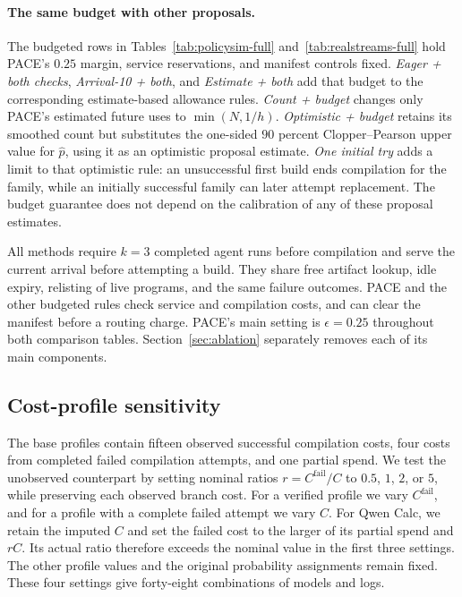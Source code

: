 \paragraph{The same budget with other proposals.}
The budgeted rows in Tables~\ref{tab:policysim-full} and~\ref{tab:realstreams-full} hold PACE's $0.25$ margin, service reservations, and manifest controls fixed.
\emph{Eager + both checks}, \emph{Arrival-10 + both}, and \emph{Estimate + both} add that budget to the corresponding estimate-based allowance rules.
\emph{Count + budget} changes only PACE's estimated future uses to $\min(N,1/h)$.
\emph{Optimistic + budget} retains its smoothed count but substitutes the one-sided $90$ percent Clopper--Pearson upper value for $\hat p$, using it as an optimistic proposal estimate.
\emph{One initial try} adds a limit to that optimistic rule: an unsuccessful first build ends compilation for the family, while an initially successful family can later attempt replacement.
The budget guarantee does not depend on the calibration of any of these proposal estimates.

All methods require $k=3$ completed agent runs before compilation and serve the current arrival before attempting a build.
They share free artifact lookup, idle expiry, relisting of live programs, and the same failure outcomes.
PACE and the other budgeted rules check service and compilation costs, and can clear the manifest before a routing charge.
PACE's main setting is $\epsilon=0.25$ throughout both comparison tables.
Section~\ref{sec:ablation} separately removes each of its main components.


\subsection{Cost-profile sensitivity}\label{app:cost-sensitivity}
\label{sec:price-sensitivity}

The base profiles contain fifteen observed successful compilation costs, four costs from completed failed compilation attempts, and one partial spend.
We test the unobserved counterpart by setting nominal ratios $r=C^{\mathrm{fail}}/C$ to $0.5$, $1$, $2$, or $5$, while preserving each observed branch cost.
For a verified profile we vary $C^{\mathrm{fail}}$, and for a profile with a complete failed attempt we vary $C$.
For Qwen Calc, we retain the imputed $C$ and set the failed cost to the larger of its partial spend and $rC$.
Its actual ratio therefore exceeds the nominal value in the first three settings.
The other profile values and the original probability assignments remain fixed.
These four settings give forty-eight combinations of models and logs.

